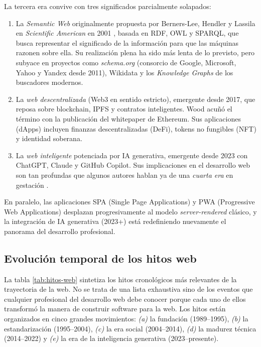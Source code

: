 \documentclass[11pt,a4paper,openany]{book}
\begin{document}
La tercera era convive con tres significados parcialmente solapados:

\begin{enumerate}
\item La \emph{Semantic Web} originalmente propuesta por Berners-Lee,
Hendler y Lassila en \emph{Scientific American} en 2001
\cite{bernerslee2001semantic}, basada en RDF, OWL y SPARQL, que busca
representar el significado de la información para que las máquinas
razonen sobre ella. Su realización plena ha sido más lenta de lo
previsto, pero subyace en proyectos como \emph{schema.org} (consorcio
de Google, Microsoft, Yahoo y Yandex desde 2011), Wikidata y los
\emph{Knowledge Graphs} de los buscadores modernos.

\item La \emph{web descentralizada} (Web3 en sentido estricto),
emergente desde 2017, que reposa sobre blockchain, IPFS y contratos
inteligentes. Wood \cite{wood2014ethereum} acuñó el término con la
publicación del whitepaper de Ethereum. Sus aplicaciones (dApps)
incluyen finanzas descentralizadas (DeFi), tokens no fungibles (NFT)
y identidad soberana.

\item La \emph{web inteligente} potenciada por IA generativa,
emergente desde 2023 con ChatGPT, Claude y GitHub Copilot. Sus
implicaciones en el desarrollo web son tan profundas que algunos
autores hablan ya de una \emph{cuarta era} en gestación
\cite{kreutzer2024ai}.
\end{enumerate}

En paralelo, las aplicaciones SPA (Single Page Applications) y PWA
(Progressive Web Applications) desplazan progresivamente al modelo
\emph{server-rendered} clásico, y la integración de IA generativa
(2023+) está redefiniendo nuevamente el panorama del desarrollo
profesional.

\subsection{Evolución temporal de los hitos web}

La tabla \ref{tab:hitos-web} sintetiza los hitos cronológicos más
relevantes de la trayectoria de la web. No se trata de una lista
exhaustiva sino de los eventos que cualquier profesional del
desarrollo web debe conocer porque cada uno de ellos transformó la
manera de construir software para la web. Los hitos están organizados
en cinco grandes movimientos: \emph{(a)} la fundación
(1989--1995), \emph{(b)} la estandarización (1995--2004), \emph{(c)}
la era social (2004--2014), \emph{(d)} la madurez técnica
(2014--2022) y \emph{(e)} la era de la inteligencia generativa
(2023--presente).
\end{document}
